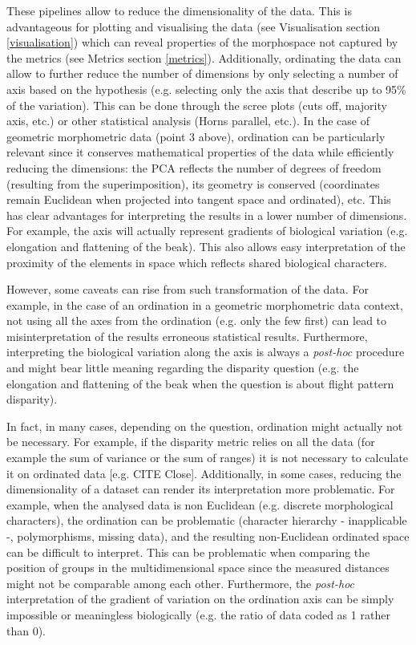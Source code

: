 \documentclass[12pt,letterpaper]{article}
\begin{document}
These pipelines allow to reduce the dimensionality of the data.
This is advantageous for plotting and visualising the data (see Visualisation section \ref{visualisation}) which can reveal properties of the morphospace not captured by the metrics (see Metrics section \ref{metrics}).
Additionally, ordinating the data can allow to further reduce the number of dimensions by only selecting a number of axis based on the hypothesis (e.g. selecting only the axis that describe up to 95\% of the variation).
This can be done through the scree plots (cuts off, majority axis, etc.) or other statistical analysis (Horns parallel, etc.).
In the case of geometric morphometric data (point 3 above), ordination can be particularly relevant since it conserves mathematical properties of the data while efficiently reducing the dimensions: the PCA reflects the number of degrees of freedom (resulting from the superimposition), its geometry is conserved (coordinates remain Euclidean when projected into tangent space and ordinated), etc.
This has clear advantages for interpreting the results in a lower number of dimensions.
For example, the axis will actually represent gradients of biological variation (e.g. elongation and flattening of the beak).
This also allows easy interpretation of the proximity of the elements in space which reflects shared biological characters.

However, some caveats can rise from such transformation of the data.
For example, in the case of an ordination in a geometric morphometric data context, not using all the axes from the ordination (e.g. only the few first) can lead to misinterpretation of the results erroneous statistical results.
Furthermore, interpreting the biological variation along the axis is always a \textit{post-hoc} procedure and might bear little meaning regarding the disparity question (e.g. the elongation and flattening of the beak when the question is about flight pattern disparity).

In fact, in many cases, depending on the question, ordination might actually not be necessary.
For example, if the disparity metric relies on all the data (for example the sum of variance or the sum of ranges) it is not necessary to calculate it on ordinated data [e.g. CITE Close].
Additionally, in some cases, reducing the dimensionality of a dataset can render its interpretation more problematic.
For example, when the analysed data is non Euclidean (e.g. discrete morphological characters), the ordination can be problematic (character hierarchy - inapplicable -, polymorphisms, missing data), and the resulting non-Euclidean ordinated space can be difficult to interpret.
This can be problematic when comparing the position of groups in the multidimensional space since the measured distances might not be comparable among each other.
Furthermore, the \textit{post-hoc} interpretation of the gradient of variation on the ordination axis can be simply impossible or meaningless biologically (e.g. the ratio of data coded as 1 rather than 0).
\end{document}
